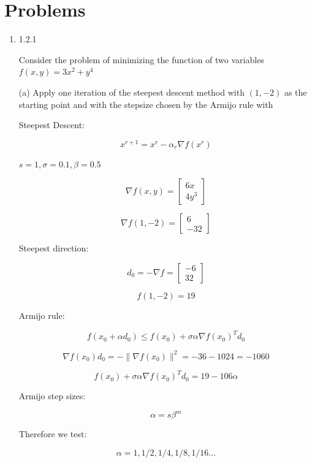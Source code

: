 \documentclass[11pt,letterpaper]{article}
\begin{document}
\section{Problems}

\begin{enumerate}

	\subsection{Textbook Problems}
	\item 1.2.1

	Consider the problem of minimizing the function of two variables $f(x,y) = 3x^2 + y^4$

	(a) Apply one iteration of the steepest descent method with 
	$(1, -2)$ as the starting point and with the stepsize chosen
	by the Armijo rule with 

	Steepest Descent:

	\[ x^{r+1} = x^r - \alpha_r \nabla f(x^r) \]

	$s = 1, \sigma = 0.1, \beta = 0.5$

	\[ \nabla f(x,y) = 
	\begin{bmatrix} 6x \\ 4y^3 \end{bmatrix}
	\]

	\[ \nabla f(1,-2) = 
	\begin{bmatrix} 6 \\ -32 \end{bmatrix}
	\]

	Steepest direction:

	\[ d_0 = - \nabla f =
	\begin{bmatrix} -6 \\ 32 \end{bmatrix}
	\] 

	\[ f(1,-2) = 19 \]

	Armijo rule:

	\[ f(x_0 + \alpha d_0) \leq f(x_0) +
	\sigma \alpha \nabla f(x_0)^T d_0 \] 

	\[ \nabla f(x_0) d_0 =
	-\| \nabla f(x_0) \|^2 = 
	-36 - 1024 =
	-1060 \]

	\[ f(x_0) +
	\sigma \alpha \nabla f(x_0)^T d_0 
	= 19 - 106 \alpha \]

	Armijo step sizes:

	\[ \alpha = s \beta^m \] 

	Therefore we test:

	\[ \alpha = 1, 1/2, 1/4, 1/8, 1/16... \] 


\end{enumerate}
\end{document}
